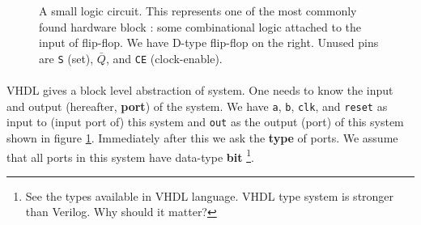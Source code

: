 \documentclass[a4paper,10pt]{article}
\begin{document}
  \begin{figure}[h] 
    \begin{center}  \end{center}

    \caption{A small logic circuit. This represents one of the most commonly
    found hardware block : some combinational logic attached to the input of
    flip-flop.  We have D-type flip-flop on the right. Unused pins are
    \texttt{S} (set), $\bar{Q}$, and \texttt{CE} (clock-enable).}
 
    \label{fig:circuit}
 
  \end{figure}

\paragraph{}

  VHDL gives a block level abstraction of system. One needs to know the input and output
  (hereafter, \textbf{port}) of the system. We have \texttt{a}, \texttt{b},
  \texttt{clk}, and \texttt{reset} as input to (input port of) this system and
  \texttt{out} as the output (port) of this system shown in figure
  \ref{fig:circuit}. Immediately after this we ask the \textbf{type} of ports.
  We assume that all ports in this system have data-type \textbf{bit}
  \footnote{See the types available in VHDL language. VHDL type system is
  stronger than Verilog. Why should it matter?}.
\end{document}
